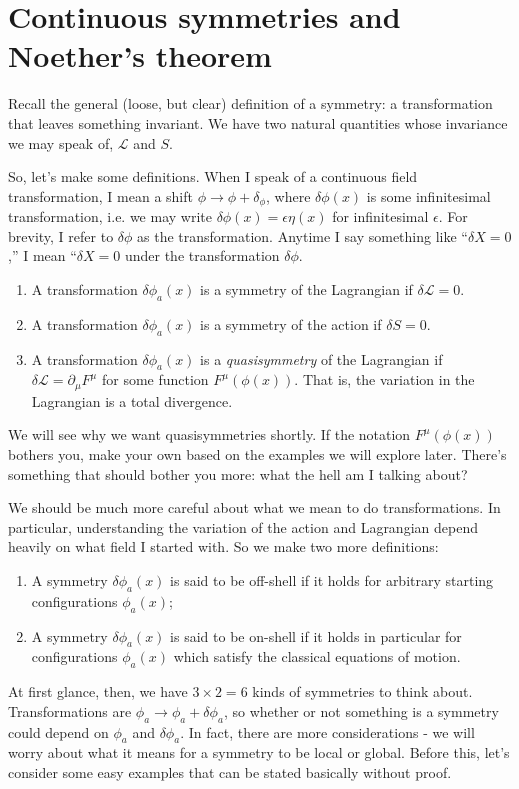 \documentclass[main.tex]{subfiles}
\begin{document}
\section{Continuous symmetries and Noether's theorem}
Recall the general (loose, but clear) definition of a symmetry: a transformation that leaves something invariant. We have two natural quantities whose invariance we may speak of, $\mathcal{L}$ and $S$. 

So, let's make some definitions. When I speak of a continuous field transformation, I mean a shift $\phi \to \phi + \delta_\phi$, where $\delta \phi (x)$ is some infinitesimal transformation, i.e. we may write $\delta \phi (x)= \epsilon \eta (x)$ for infinitesimal $\epsilon$. For brevity, I refer to $\delta \phi$ as the transformation. Anytime I say something like ``$\delta X = 0$,'' I mean ``$\delta X = 0$ under the transformation $\delta \phi$.

\begin{enumerate}
\item A transformation $\delta \phi_a (x)$ is a symmetry of the Lagrangian if $\delta \mathcal{L} = 0$. 

\item A transformation $\delta \phi_a (x)$ is a symmetry of the action if $\delta S = 0$.

\item A transformation $\delta \phi_a (x)$ is a \textit{quasisymmetry} of the Lagrangian if $\delta \mathcal{L} = \partial_\mu F^{\mu}$ for some function $F^\mu (\phi(x))$. That is, the variation in the Lagrangian is a total divergence.
\end{enumerate}

We will see why we want quasisymmetries shortly. If the notation $F^\mu (\phi(x))$ bothers you, make your own based on the examples we will explore later. There's something that should bother you more: what the hell am I talking about?

We should be much more careful about what we mean to do transformations. In particular, understanding the variation of the action and Lagrangian depend heavily on what field I started with. So we make two more definitions:
\begin{enumerate}
\item A symmetry $\delta \phi_a (x)$ is said to be off-shell if it holds for arbitrary starting configurations $\phi_a (x)$;

\item A symmetry $\delta \phi_a (x)$ is said to be on-shell if it holds in particular for configurations $\phi_a (x)$ which satisfy the classical equations of motion.
\end{enumerate}
At first glance, then, we have $3\times 2 = 6$ kinds of symmetries to think about. Transformations are $\phi_a \to \phi_a + \delta \phi_a$, so whether or not something is a symmetry could depend on $\phi_a$ and $\delta \phi_a$. In fact, there are more considerations - we will worry about what it means for a symmetry to be local or global. Before this, let's consider some easy examples that can be stated basically without proof.
\end{document}
